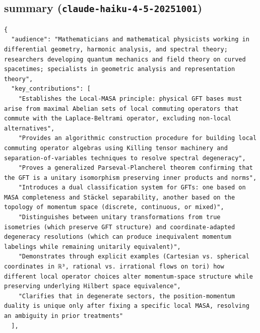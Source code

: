 \documentclass[11pt]{article}
\begin{document}
\subsection*{summary (\texttt{claude-haiku-4-5-20251001})}
\begin{verbatim}
{
  "audience": "Mathematicians and mathematical physicists working in differential geometry, harmonic analysis, and spectral theory; researchers developing quantum mechanics and field theory on curved spacetimes; specialists in geometric analysis and representation theory",
  "key_contributions": [
    "Establishes the Local-MASA principle: physical GFT bases must arise from maximal Abelian sets of local commuting operators that commute with the Laplace-Beltrami operator, excluding non-local alternatives",
    "Provides an algorithmic construction procedure for building local commuting operator algebras using Killing tensor machinery and separation-of-variables techniques to resolve spectral degeneracy",
    "Proves a generalized Parseval-Plancherel theorem confirming that the GFT is a unitary isomorphism preserving inner products and norms",
    "Introduces a dual classification system for GFTs: one based on MASA completeness and Stäckel separability, another based on the topology of momentum space (discrete, continuous, or mixed)",
    "Distinguishes between unitary transformations from true isometries (which preserve GFT structure) and coordinate-adapted degeneracy resolutions (which can produce inequivalent momentum labelings while remaining unitarily equivalent)",
    "Demonstrates through explicit examples (Cartesian vs. spherical coordinates in ℝ³, rational vs. irrational flows on tori) how different local operator choices alter momentum-space structure while preserving underlying Hilbert space equivalence",
    "Clarifies that in degenerate sectors, the position-momentum duality is unique only after fixing a specific local MASA, resolving an ambiguity in prior treatments"
  ],

\end{verbatim}
\end{document}
